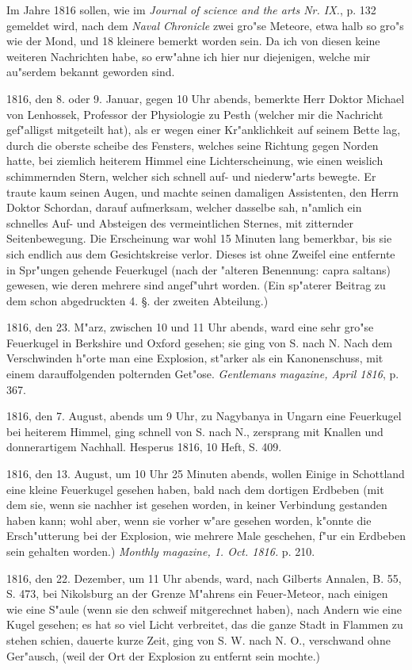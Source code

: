 \documentclass[a4paper, 11pt, oneside, polutonikogreek, german]{article}
\begin{document}
Im Jahre 1816 sollen, wie im \emph{Journal of science and the arts Nr. IX.}, p. 132 gemeldet wird, nach dem \emph{Naval Chronicle} zwei gro"se Meteore, etwa halb so gro"s wie der Mond, und 18 kleinere bemerkt worden sein. Da ich von diesen keine weiteren Nachrichten habe, so erw"ahne ich hier nur diejenigen, welche mir au"serdem bekannt geworden sind.

1816, den 8. oder 9. Januar, gegen 10 Uhr abends, bemerkte Herr Doktor Michael von Lenhossek, Professor der Physiologie zu Pesth (welcher mir die Nachricht gef"alligst mitgeteilt hat), als er wegen einer Kr"anklichkeit auf seinem Bette lag, durch die oberste scheibe des Fensters, welches seine Richtung gegen Norden hatte, bei ziemlich heiterem Himmel eine Lichterscheinung, wie einen weislich schimmernden Stern, welcher sich schnell auf- und niederw"arts bewegte. Er traute kaum seinen Augen, und machte seinen damaligen Assistenten, den Herrn Doktor Schordan, darauf aufmerksam, welcher dasselbe sah, n"amlich ein schnelles Auf- und Absteigen des vermeintlichen Sternes, mit zitternder Seitenbewegung. Die Erscheinung war wohl 15 Minuten lang bemerkbar, bis sie sich endlich aus dem Gesichtskreise verlor. Dieses ist ohne Zweifel eine entfernte in Spr"ungen gehende Feuerkugel (nach der "alteren Benennung: capra saltans) gewesen, wie deren mehrere sind angef"uhrt worden. (Ein sp"aterer Beitrag zu dem schon abgedruckten 4. §. der zweiten Abteilung.)

1816, den 23. M"arz, zwischen 10 und 11 Uhr abends, ward eine sehr gro"se Feuerkugel in Berkshire und Oxford gesehen; sie ging von S. nach N. Nach dem Verschwinden h"orte man eine Explosion, st"arker als ein Kanonenschuss, mit einem darauffolgenden polternden Get"ose. \emph{Gentlemans magazine, April 1816}, p. 367.

1816, den 7. August, abends um 9 Uhr, zu Nagybanya in Ungarn eine Feuerkugel bei heiterem Himmel, ging schnell von S. nach N., zersprang mit Knallen und donnerartigem Nachhall. Hesperus 1816, 10 Heft, S. 409.

1816, den 13. August, um 10 Uhr 25 Minuten abends, wollen Einige in Schottland eine kleine Feuerkugel gesehen haben, bald nach dem dortigen Erdbeben (mit dem sie, wenn sie nachher ist gesehen worden, in keiner Verbindung gestanden haben kann; wohl aber, wenn sie vorher w"are gesehen worden, k"onnte die Ersch"utterung bei der Explosion, wie mehrere Male geschehen, f"ur ein Erdbeben sein gehalten worden.) \emph{Monthly magazine, 1. Oct. 1816.} p. 210.

1816, den 22. Dezember, um 11 Uhr abends, ward, nach Gilberts Annalen, B. 55, S. 473, bei Nikolsburg an der Grenze M"ahrens ein Feuer-Meteor, nach einigen wie eine S"aule (wenn sie den schweif mitgerechnet haben), nach Andern wie eine Kugel gesehen; es hat so viel Licht verbreitet, das die ganze Stadt in Flammen zu stehen schien, dauerte kurze Zeit, ging von S. W. nach N. O., verschwand ohne Ger"ausch, (weil der Ort der Explosion zu entfernt sein mochte.)
\end{document}
